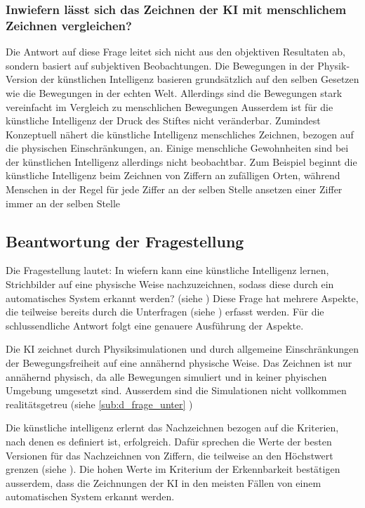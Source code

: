 \subsubsection*{Inwiefern lässt sich das Zeichnen der KI mit menschlichem Zeichnen vergleichen?}\label{subsub:d_frage_unter_6}
Die Antwort auf diese Frage leitet sich nicht aus den objektiven Resultaten ab,
sondern basiert auf subjektiven Beobachtungen. Die Bewegungen in der
Physik-Version der künstlichen Intelligenz basieren grundsätzlich auf den selben
Gesetzen wie die Bewegungen in der echten Welt. Allerdings sind die Bewegungen
stark vereinfacht im Vergleich zu menschlichen Bewegungen Ausserdem ist für die
künstliche Intelligenz der Druck des Stiftes nicht veränderbar. Zumindest
Konzeptuell nähert die künstliche Intelligenz menschliches Zeichnen,
bezogen auf die physischen Einschränkungen, an. Einige menschliche Gewohnheiten
sind bei der künstlichen Intelligenz allerdings nicht beobachtbar. Zum Beispiel
beginnt die künstliche Intelligenz beim Zeichnen von Ziffern an zufälligen
Orten, während Menschen in der Regel für jede Ziffer an der selben Stelle
ansetzen einer Ziffer immer an der selben Stelle


\subsection{Beantwortung der Fragestellung}\label{sub:d_frage_frag}
Die Fragestellung lautet: In wiefern kann eine künstliche Intelligenz lernen,
Strichbilder auf eine physische Weise nachzuzeichnen, sodass diese durch ein
automatisches System erkannt werden? (siehe ) Diese Frage
hat mehrere Aspekte, die teilweise bereits durch die Unterfragen (siehe
) erfasst werden. Für die schlussendliche Antwort
folgt eine genauere Ausführung der Aspekte.

Die KI zeichnet durch Physiksimulationen und durch allgemeine Einschränkungen
der Bewegungsfreiheit auf eine annähernd physische Weise. Das Zeichnen ist nur
annähernd physisch, da alle Bewegungen simuliert und in keiner phyischen
Umgebung umgesetzt sind. Ausserdem sind die Simulationen nicht vollkommen
realitätsgetreu (siehe \ref{sub:d_frage_unter} )

Die künstliche intelligenz erlernt das Nachzeichnen bezogen auf die Kriterien,
nach denen es definiert ist, erfolgreich. Dafür sprechen die Werte der besten
Versionen für das Nachzeichnen von Ziffern, die teilweise an den Höchstwert
grenzen (siehe ). Die hohen Werte im Kriterium der
Erkennbarkeit bestätigen ausserdem, dass die Zeichnungen der KI in den meisten
Fällen von einem automatischen System erkannt werden.

